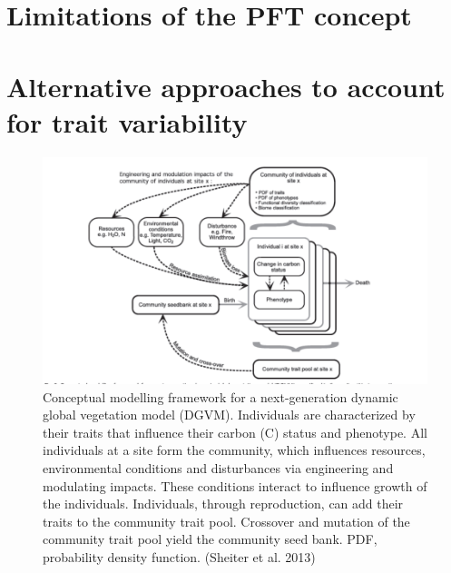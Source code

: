 \documentclass[12pt,oneside]{book}
\begin{document}
\section{Limitations of the PFT
concept}\label{limitations-of-the-pft-concept}

\section{Alternative approaches to account for trait
variability}\label{alternative-approaches-to-account-for-trait-variability}

\begin{figure}

{\centering \includegraphics[width=0.8\linewidth]{figures/chap7/f717_aDGVM} 

}

\caption{Conceptual modelling framework for a next-generation dynamic global vegetation model (DGVM). Individuals are characterized by their traits that influence their carbon (C) status and phenotype. All individuals at a site form the community, which influences resources, environmental conditions and disturbances via engineering and modulating impacts. These conditions interact to influence growth of the individuals. Individuals, through reproduction, can add their traits to the community trait pool. Crossover and mutation of the community trait pool yield the community seed bank. PDF, probability density function. (Sheiter et al. 2013)}\label{fig:f717}
\end{figure}
\end{document}
